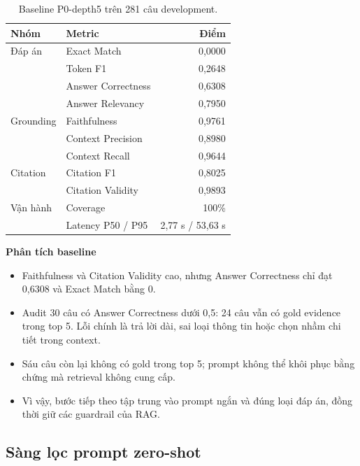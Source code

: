 \begin{table}[H]
  \centering
  \caption{Baseline P0-depth5 trên 281 câu development.}
  \label{tab:phase2-baseline}
  \small
  \begin{tabular}{llr}
    \toprule
    \textbf{Nhóm} & \textbf{Metric} & \textbf{Điểm} \\
    \midrule
    Đáp án & Exact Match & 0,0000 \\
           & Token F1 & 0,2648 \\
           & Answer Correctness & 0,6308 \\
           & Answer Relevancy & 0,7950 \\
    \midrule
    Grounding & Faithfulness & 0,9761 \\
              & Context Precision & 0,8980 \\
              & Context Recall & 0,9644 \\
    \midrule
    Citation & Citation F1 & 0,8025 \\
             & Citation Validity & 0,9893 \\
    \midrule
    Vận hành & Coverage & 100\% \\
             & Latency P50 / P95 & 2,77 s / 53,63 s \\
    \bottomrule
  \end{tabular}
\end{table}

\noindent\textbf{Phân tích baseline}
\begin{itemize}
  \item Faithfulness và Citation Validity cao, nhưng Answer Correctness chỉ đạt
  0,6308 và Exact Match bằng 0.
  \item Audit 30 câu có Answer Correctness dưới 0,5: 24 câu vẫn có gold evidence
  trong top 5. Lỗi chính là trả lời dài, sai loại thông tin hoặc chọn nhầm chi
  tiết trong context.
  \item Sáu câu còn lại không có gold trong top 5; prompt không thể khôi phục
  bằng chứng mà retrieval không cung cấp.
  \item Vì vậy, bước tiếp theo tập trung vào prompt ngắn và đúng loại đáp án,
  đồng thời giữ các guardrail của RAG.
\end{itemize}

\subsection{Sàng lọc prompt zero-shot}

